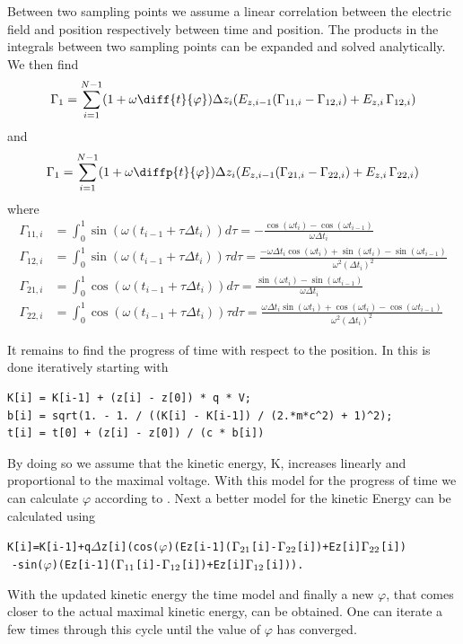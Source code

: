 Between two sampling points we assume a linear correlation between the electric field and position respectively between time and position. The products in the  integrals between two sampling points can be expanded and solved analytically. We then find
\begin{equation*}
\Gamma_1 = \sum_{i=1}^{N-1} (1 + \omega \diff{t}{\varphi}) \Delta z_{i}(E_{z,i-1} (\Gamma_{11,i} - \Gamma_{12,i}) + E_{z,i}\, \Gamma_{12,i})
\end{equation*}
and
\begin{equation*}
\Gamma_1 = \sum_{i=1}^{N-1} (1 + \omega \diffp{t}{\varphi}) \Delta z_{i}(E_{z,i-1} (\Gamma_{21,i} - \Gamma_{22,i}) + E_{z,i}\, \Gamma_{22,i})
\end{equation*}
where
\begin{align*}
  \Gamma_{11,i} &= \int_0^1 \sin(\omega(t_{i-1} + \tau \Delta t_{i})) d\tau = - \frac{\cos(\omega t_{i}) - \cos(\omega t_{i-1})}{\omega \Delta t_{i}}\\
  \Gamma_{12,i} &= \int_0^1 \sin(\omega(t_{i-1} + \tau \Delta t_{i})) \tau d\tau = \frac{-\omega \Delta t_{i} \cos(\omega t_{i}) + \sin(\omega t_{i}) - \sin(\omega t_{i-1})}{\omega^2 (\Delta t_{i})^2}\\
  \Gamma_{21,i} &= \int_0^1 \cos(\omega(t_{i-1} + \tau \Delta t_{i})) d\tau = \frac{\sin(\omega t_{i}) - \sin(\omega t_{i-1})}{\omega \Delta t_{i}}\\
  \Gamma_{22,i} &= \int_0^1 \cos(\omega(t_{i-1} + \tau \Delta t_{i})) \tau d\tau = \frac{\omega \Delta t_{i} \sin(\omega t_{i}) + \cos(\omega t_{i}) - \cos(\omega t_{i-1})}{\omega^2 (\Delta t_{i})^2}
\end{align*}

It remains to find the progress of time with respect to the position. In \opal this is done iteratively starting with
\begin{verbatim}
K[i] = K[i-1] + (z[i] - z[0]) * q * V;
b[i] = sqrt(1. - 1. / ((K[i] - K[i-1]) / (2.*m*c^2) + 1)^2);
t[i] = t[0] + (z[i] - z[0]) / (c * b[i])
\end{verbatim}
By doing so we assume that the kinetic energy, K, increases linearly and proportional to the maximal voltage. With this model for the progress of time we can calculate $\varphi$ according to . Next a better model for the kinetic Energy can be calculated using
\begin{alltt}
K[i] = K[i-1] + q \(\Delta\)z[i](cos(\(\varphi\))(Ez[i-1](\(\Gamma\sb{21}\)[i] - \(\Gamma\sb{22}\)[i]) + Ez[i]\(\Gamma\sb{22}\)[i])
                      \(\,\,\)- sin(\(\varphi\))(Ez[i-1](\(\Gamma\sb{11}\)[i] - \(\Gamma\sb{12}\)[i]) + Ez[i]\(\Gamma\sb{12}\)[i])).
\end{alltt}
With the updated kinetic energy the time model and finally a new $\varphi$, that comes closer to the actual maximal kinetic energy, can be obtained. One can iterate a few times through this cycle until the value of $\varphi$ has converged.

